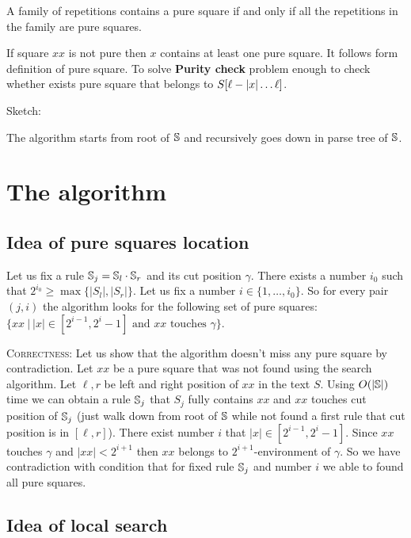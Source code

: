 ﻿\documentclass[11pt]{article}
\begin{document}
\begin{lem}[{\rm\cite{2}}]
A family of repetitions contains a pure square if and only if all the repetitions in the family are pure squares.
\end{lem}

If square $xx$ is not pure then $x$ contains at least one pure square. It follows form definition of pure square. To
solve \textbf{Purity check} problem enough to check whether exists pure square that belongs to $S[\ell - |x|\dots\ell]$. 

Sketch: 

The algorithm starts from root of $\mathbb{S}$ and recursively goes down in parse tree of $\mathbb{S}$. 

\section{The algorithm}

\subsection{Idea of pure squares location}

Let us fix a rule $\mathbb{S}_j = \mathbb{S}_l \cdot \mathbb{S}_r$ and its cut position $\gamma$. There exists a number
$i_0$ such that $2^{i_0} \geq \max\{|S_l|, |S_r|\}$. Let us fix a number $i \in \{ 1, \dots, i_0 \}$. So for
every pair $(j, i)$ the algorithm looks for the following set of pure squares: $\{xx \ | \ |x| \in
[2^{i-1}, 2^i-1] \mbox{ and $xx$ touches $\gamma$}\}$.

\noindent \textsc{Correctness:} Let us show that the algorithm doesn't miss any pure square by contradiction. Let $xx$
be a pure square that was not found using the search algorithm. Let $\ell, r$ be left and right position of $xx$ in the
text $S$. Using $O(|\mathbb{S}|)$ time we can obtain a rule $\mathbb{S}_j$ that $S_j$ fully contains $xx$ and $xx$ touches cut
position of $\mathbb{S}_j$ (just walk down from root of $\mathbb{S}$ while not found a first rule that cut position is in
$[\ell, r]$). There exist number $i$ that $|x| \in [2^{i-1}, 2^i-1]$. Since $xx$ touches $\gamma$ and $|xx| < 2^{i+1}$ 
then $xx$ belongs to $2^{i+1}$-environment of $\gamma$. So we have contradiction with condition that for fixed rule 
$\mathbb{S}_j$ and number $i$ we able to found all pure squares.

\subsection{Idea of local search}
\end{document}
